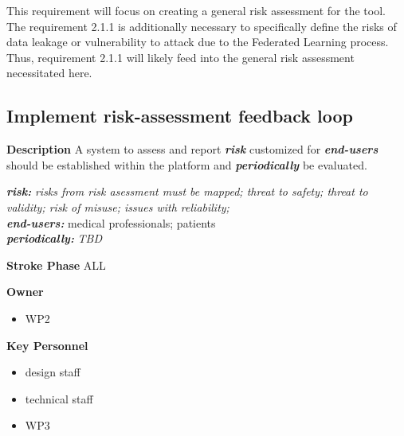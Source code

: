 \documentclass[
  letterpaper,
  DIV=11,
  numbers=noendperiod]{scrreport}
\providecommand{\tightlist}{%
  \setlength{\itemsep}{0pt}\setlength{\parskip}{0pt}}\usepackage{longtable,booktabs,array}
\begin{document}
\begin{tcolorbox}[enhanced jigsaw, arc=.35mm, breakable, coltitle=black, toptitle=1mm, colbacktitle=quarto-callout-note-color!10!white, toprule=.15mm, left=2mm, bottomrule=.15mm, opacitybacktitle=0.6, titlerule=0mm, colback=white, opacityback=0, title=\textcolor{quarto-callout-note-color}{\faInfo}\hspace{0.5em}{Note}, bottomtitle=1mm, colframe=quarto-callout-note-color-frame, leftrule=.75mm, rightrule=.15mm]

This requirement will focus on creating a general risk assessment for
the tool. The requirement 2.1.1 is additionally necessary to
specifically define the risks of data leakage or vulnerability to attack
due to the Federated Learning process. Thus, requirement 2.1.1 will
likely feed into the general risk assessment necessitated here.

\end{tcolorbox}

\hypertarget{implement-risk-assessment-feedback-loop}{%
\subsection{Implement risk-assessment feedback
loop}\label{implement-risk-assessment-feedback-loop}}

\textbf{Description} A system to assess and report \textbf{\emph{risk}}
customized for \textbf{\emph{end-users}} should be established within
the platform and \textbf{\emph{periodically}} be evaluated.

\textbf{\emph{risk:}} \emph{risks from risk asessment must be mapped;
threat to safety; threat to validity; risk of misuse; issues with
reliability;}\\
\textbf{\emph{end-users:}} medical professionals; patients\\
\textbf{\emph{periodically:}} \emph{TBD}

\textbf{Stroke Phase} ALL

\textbf{Owner}

\begin{itemize}
\tightlist
\item
  WP2
\end{itemize}

\textbf{Key Personnel}

\begin{itemize}
\tightlist
\item
  design staff
\item
  technical staff
\item
  WP3
\end{itemize}
\end{document}
